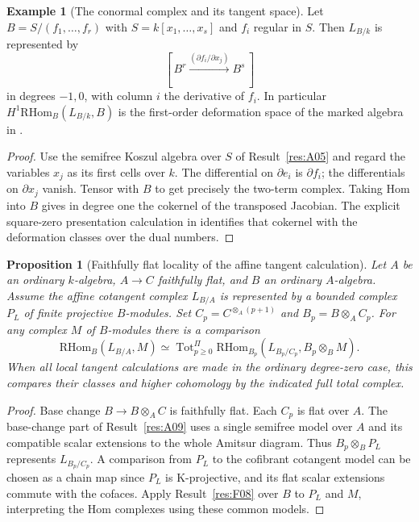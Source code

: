 \documentclass[11pt,oneside,openany]{book}
\newtheorem{proposition}[theorem]{Proposition}
\theoremstyle{definition}
\newtheorem{example}[theorem]{Example}
\theoremstyle{remark}
\begin{document}
\begin{example}[The conormal complex and its tangent space]\label{res:A11}
Let \(B=S/(f_1,\ldots,f_r)\) with \(S=k[x_1,\ldots,x_s]\) and
\(f_i\) regular in \(S\). Then \(L_{B/k}\) is represented by
\[
    [\,B^r\xrightarrow{(\partial f_i/\partial x_j)}B^s\,]
\]
in degrees \(-1,0\), with column \(i\) the derivative of \(f_i\).
In particular \(H^1\mathrm{RHom}_B(L_{B/k},B)\) is the first-order
deformation space of the marked algebra in
\cite[T04]{ca-topics}.
\end{example}
\begin{proof}
Use the semifree Koszul algebra over \(S\) of Result~\ref{res:A05}
and regard the variables \(x_j\) as its first cells over \(k\).
The differential on \(\partial e_i\) is \(\partial f_i\);
the differentials on \(\partial x_j\) vanish. Tensor with \(B\)
to get precisely the two-term complex.
Taking Hom into \(B\) gives in degree one the cokernel of
the transposed Jacobian. The explicit square-zero presentation
calculation in \cite[T02--T04]{ca-topics} identifies that cokernel
with the deformation classes over the dual numbers.
\end{proof}

\begin{proposition}[Faithfully flat locality of the affine tangent calculation]\label{res:A12}
Let \(A\) be an ordinary \(k\)-algebra, \(A\to C\) faithfully
flat, and \(B\) an ordinary \(A\)-algebra. Assume the affine
cotangent complex \(L_{B/A}\) is represented by a bounded complex
\(P_L\) of finite projective \(B\)-modules. Set
\(C_p=C^{\otimes_A(p+1)}\) and \(B_p=B\otimes_A C_p\).
For any complex \(M\) of \(B\)-modules there is a comparison
\[
 \mathrm{RHom}_B(L_{B/A},M)
 \simeq \operatorname{Tot}^{\Pi}_{p\geq0}
     \mathrm{RHom}_{B_p}(L_{B_p/C_p}, B_p\otimes_B M).
\]
When all local tangent calculations are made in the ordinary
degree-zero case, this compares their classes and higher
cohomology by the indicated full total complex.
\end{proposition}
\begin{proof}
Base change \(B\to B\otimes_A C\) is faithfully flat.
Each \(C_p\) is flat over \(A\). The base-change part of
Result~\ref{res:A09} uses a single semifree model over \(A\)
and its compatible scalar extensions to the whole Amitsur diagram.
Thus \(B_p\otimes_B P_L\) represents \(L_{B_p/C_p}\).
A comparison from \(P_L\) to the cofibrant cotangent model can
be chosen as a chain map since \(P_L\) is K-projective, and its
flat scalar extensions commute with the cofaces. Apply
Result~\ref{res:F08} over \(B\) to \(P_L\) and \(M\), interpreting
the Hom complexes using these common models.
\end{proof}
\end{document}
